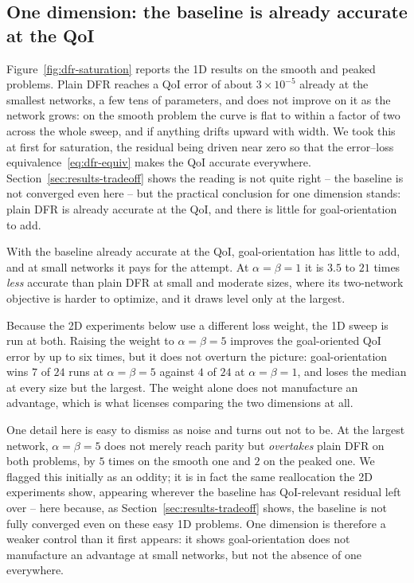 \documentclass[preprint,11pt]{elsarticle}
\begin{document}
\subsection{One dimension: the baseline is already accurate at the QoI}
\label{sec:results-1d}

Figure~\ref{fig:dfr-saturation} reports the 1D results on the smooth and peaked problems. Plain DFR reaches a QoI error of about $3 \times 10^{-5}$ already at the smallest networks, a few tens of parameters, and does not improve on it as the network grows: on the smooth problem the curve is flat to within a factor of two across the whole sweep, and if anything drifts upward with width. We took this at first for saturation, the residual being driven near zero so that the error--loss equivalence~\eqref{eq:dfr-equiv} makes the QoI accurate everywhere. Section~\ref{sec:results-tradeoff} shows the reading is not quite right -- the baseline is not converged even here -- but the practical conclusion for one dimension stands: plain DFR is already accurate at the QoI, and there is little for goal-orientation to add.

With the baseline already accurate at the QoI, goal-orientation has little to add, and at small networks it pays for the attempt. At $\alpha = \beta = 1$ it is $3.5$ to $21$ times \emph{less} accurate than plain DFR at small and moderate sizes, where its two-network objective is harder to optimize, and it draws level only at the largest.

Because the 2D experiments below use a different loss weight, the 1D sweep is run at both. Raising the weight to $\alpha = \beta = 5$ improves the goal-oriented QoI error by up to six times, but it does not overturn the picture: goal-orientation wins $7$ of $24$ runs at $\alpha = \beta = 5$ against $4$ of $24$ at $\alpha = \beta = 1$, and loses the median at every size but the largest. The weight alone does not manufacture an advantage, which is what licenses comparing the two dimensions at all.

One detail here is easy to dismiss as noise and turns out not to be. At the largest network, $\alpha = \beta = 5$ does not merely reach parity but \emph{overtakes} plain DFR on both problems, by $5$ times on the smooth one and $2$ on the peaked one. We flagged this initially as an oddity; it is in fact the same reallocation the 2D experiments show, appearing wherever the baseline has QoI-relevant residual left over -- here because, as Section~\ref{sec:results-tradeoff} shows, the baseline is not fully converged even on these easy 1D problems. One dimension is therefore a weaker control than it first appears: it shows goal-orientation does not manufacture an advantage at small networks, but not the absence of one everywhere.
\end{document}
